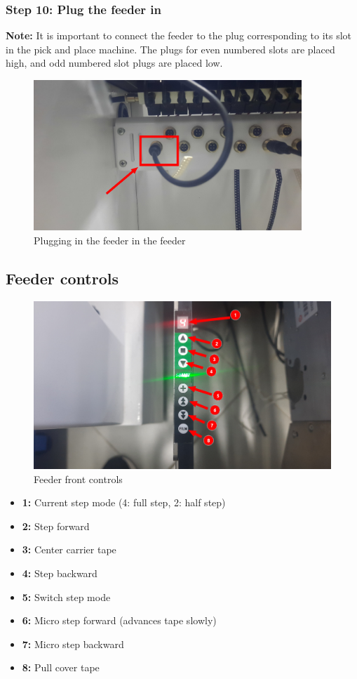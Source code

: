 \documentclass[a4paper,10pt]{report}
\begin{document}
\subsubsection{Step 10: Plug the feeder in}
\textbf{Note: } It is important to connect the feeder to the plug corresponding to its slot in the pick and place machine. The plugs for even numbered slots are placed high, and odd numbered slot plugs are placed low.
\begin{figure}[!htb]
 \centering
 \includegraphics[width=0.9\textwidth]{images/step10.png}
 \caption{Plugging in the feeder in the feeder}
\end{figure}
\newpage
\subsection{Feeder controls}
\begin{figure}[!htb]
 \centering
 \includegraphics[width=1\textwidth]{images/controls.png}
 \caption{Feeder front controls}
\end{figure}
\begin{itemize}
 \item \textbf{1: } Current step mode (4: full step, 2: half step)
 \item \textbf{2: } Step forward
 \item \textbf{3: } Center carrier tape
 \item \textbf{4: } Step backward
 \item \textbf{5: } Switch step mode
 \item \textbf{6: } Micro step forward (advances tape slowly)
 \item \textbf{7: } Micro step backward
 \item \textbf{8: } Pull cover tape
\end{itemize}
\newpage
\end{document}
